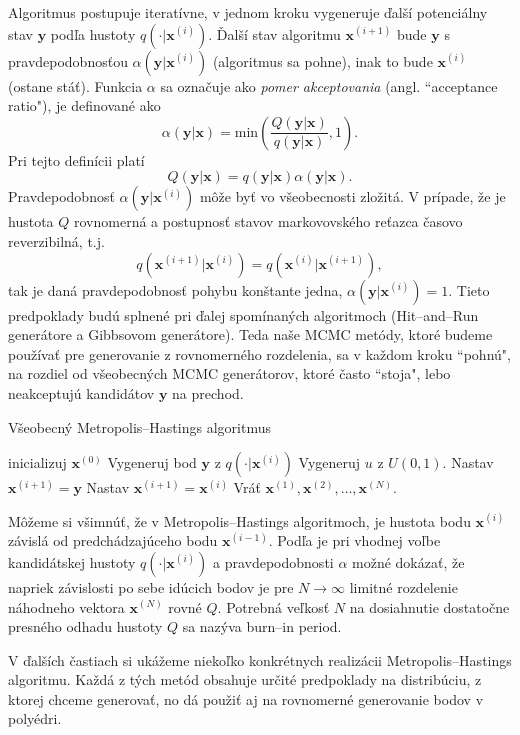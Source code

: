 Algoritmus postupuje iteratívne, v jednom kroku vygeneruje ďalší potenciálny stav $\mathbf y$ podľa hustoty $q(\cdot |\mathbf x^{(i)})$. Ďalší stav algoritmu $\mathbf x^{(i+1)}$ bude $\mathbf y$ s pravdepodobnosťou $\alpha (\mathbf y|\mathbf x^{(i)})$ (algoritmus sa pohne), inak to bude $\mathbf x^{(i)}$ (ostane stáť). Funkcia $\alpha$ sa označuje ako \textit{pomer akceptovania} (angl. ``acceptance ratio"), je definované ako $$\alpha (\mathbf y|\mathbf x) = \text{min}(\frac {Q(\mathbf y|\mathbf x)}{q(\mathbf y | \mathbf x)}, 1).$$ Pri tejto definícii platí $$Q(\mathbf y| \mathbf x)=q(\mathbf y | \mathbf x)\alpha(\mathbf y|\mathbf x).$$
Pravdepodobnosť $\alpha (\mathbf y|\mathbf x^{(i)})$ môže byť vo všeobecnosti zložitá. V prípade, že je hustota $Q$ rovnomerná a postupnosť stavov markovovského reťazca časovo reverzibilná, t.j. $$q(\mathbf x^{(i+1)}|\mathbf x^{(i)})=q(\mathbf x^{(i)}|\mathbf x^{(i+1)}),$$ tak je daná pravdepodobnosť pohybu konštante jedna, $\alpha (\mathbf y|\mathbf x^{(i)})=1$. Tieto predpoklady budú splnené pri ďalej spomínaných algoritmoch (Hit--and--Run generátore a Gibbsovom generátore). Teda naše MCMC metódy, ktoré budeme používať pre generovanie z rovnomerného rozdelenia, sa v každom kroku ``pohnú", na rozdiel od všeobecných MCMC generátorov, ktoré často ``stoja", lebo neakceptujú kandidátov $\mathbf y$ na prechod.

\begin{algorithm}[H]
	\caption{Všeobecný Metropolis--Hastings algoritmus \cite{metropolis-hastings_chib}}
	\label{metropolis-hastings}
	\begin{algorithmic}[1]
		\State inicializuj $\mathbf x^{(0)}$
			\State Vygeneruj bod $\mathbf y$ z $q(\cdot|\mathbf x^{(i)})$
			\State Vygeneruj $u$ z $U(0,1)$.
				\State Nastav $\mathbf x^{(i+1)}=\mathbf y$
			\Else
				\State Nastav $\mathbf x^{(i+1)}=\mathbf x^{(i)}$
			\EndIf
		\EndFor
		\State Vráť ${\mathbf x^{(1)},\mathbf x^{(2)},\dots,\mathbf x^{(N)}}$.
	\end{algorithmic}
\end{algorithm}

Môžeme si všimnúť, že v Metropolis--Hastings algoritmoch, je hustota bodu $\mathbf x^{(i)}$ závislá od predchádzajúceho bodu $\mathbf x^{(i-1)}$. Podľa \cite{metropolis-hastings_chib} je pri vhodnej voľbe kandidátskej hustoty $q(\cdot|\mathbf x^{(i)})$ a pravdepodobnosti $\alpha$ možné dokázať, že napriek závislosti po sebe idúcich bodov je pre $N \rightarrow \infty$ limitné rozdelenie náhodneho vektora $\mathbf x^{(N)}$ rovné $Q$. Potrebná veľkosť $N$ na dosiahnutie dostatočne presného odhadu hustoty $Q$ sa nazýva burn--in period.

V ďalších častiach si ukážeme niekoľko konkrétnych realizácii Metropolis--Hastings algoritmu. Každá z tých metód obsahuje určité predpoklady na distribúciu, z ktorej chceme generovať, no dá použiť aj na rovnomerné generovanie bodov v polyédri.